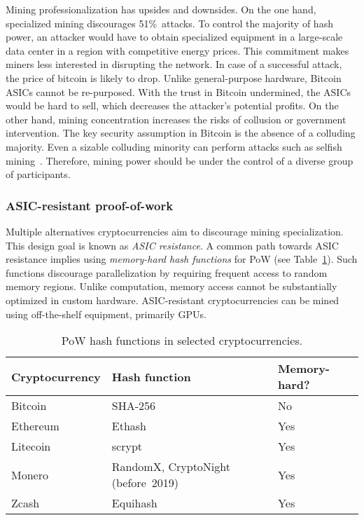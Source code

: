 Mining professionalization has upsides and downsides.
On the one hand, specialized mining discourages 51\%~attacks.
To control the majority of hash power, an attacker would have to obtain specialized equipment in a large-scale data center in a region with competitive energy prices.
This commitment makes miners less interested in disrupting the network.
In case of a successful attack, the price of bitcoin is likely to drop.
Unlike general-purpose hardware, Bitcoin ASICs cannot be re-purposed.
With the trust in Bitcoin undermined, the ASICs would be hard to sell, which decreases the attacker's potential profits.
On the other hand, mining concentration increases the risks of collusion or government intervention.
The key security assumption in Bitcoin is the absence of a colluding majority.
Even a sizable colluding minority can perform attacks such as selfish mining~\cite{Eyal2018}.
Therefore, mining power should be under the control of a diverse group of participants.


\subsubsection*{ASIC-resistant proof-of-work}

Multiple alternatives cryptocurrencies aim to discourage mining specialization.
This design goal is known as \textit{ASIC resistance}.
A common path towards ASIC resistance implies using \textit{memory-hard hash functions} for PoW (see Table~\ref{tab:pow-coins-hash-functions}).
Such functions discourage parallelization by requiring frequent access to random memory regions.
Unlike computation, memory access cannot be substantially optimized in custom hardware.
ASIC-resistant cryptocurrencies can be mined using off-the-shelf equipment, primarily GPUs.

\begin{table}[]
	\caption{PoW hash functions in selected cryptocurrencies.}
	\begin{tabular}{|l|l|l|}
		\hline
		\textbf{Cryptocurrency} & \textbf{Hash function} & \textbf{Memory-hard?} \\ \hline
		Bitcoin & SHA-256 & No \\ \hline
		Ethereum & Ethash & Yes \\ \hline
		Litecoin & scrypt & Yes \\ \hline
		Monero & RandomX, CryptoNight (before~2019) & Yes \\ \hline
		Zcash & Equihash & Yes \\ \hline
	\end{tabular}
	\label{tab:pow-coins-hash-functions}
\end{table}

